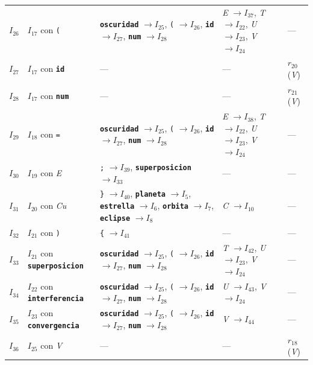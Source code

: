 \documentclass[12pt, letterpaper]{article}
\begin{document}
{\begin{longtable}{c l p{5.0cm} p{2.6cm} p{3.6cm}}
\addlinespace[2pt]
$I_{26}$ & $I_{17}$ con \texttt{(} & \textbf{\texttt{oscuridad}} $\to I_{25}$, \texttt{(} $\to I_{26}$, \textbf{\texttt{id}} $\to I_{27}$, \textbf{\texttt{num}} $\to I_{28}$ & \textit{E} $\to I_{37}$, \textit{T} $\to I_{22}$, \textit{U} $\to I_{23}$, \textit{V} $\to I_{24}$ & --- \\
\addlinespace[2pt]
$I_{27}$ & $I_{17}$ con \textbf{\texttt{id}} & --- & --- & $r_{20}$ (\textit{V}) \\
\addlinespace[2pt]
$I_{28}$ & $I_{17}$ con \textbf{\texttt{num}} & --- & --- & $r_{21}$ (\textit{V}) \\
\addlinespace[2pt]
$I_{29}$ & $I_{18}$ con \texttt{=} & \textbf{\texttt{oscuridad}} $\to I_{25}$, \texttt{(} $\to I_{26}$, \textbf{\texttt{id}} $\to I_{27}$, \textbf{\texttt{num}} $\to I_{28}$ & \textit{E} $\to I_{38}$, \textit{T} $\to I_{22}$, \textit{U} $\to I_{23}$, \textit{V} $\to I_{24}$ & --- \\
\addlinespace[2pt]
$I_{30}$ & $I_{19}$ con \textit{E} & \texttt{;} $\to I_{39}$, \textbf{\texttt{superposicion}} $\to I_{33}$ & --- & --- \\
\addlinespace[2pt]
$I_{31}$ & $I_{20}$ con \textit{Cu} & \texttt{\}} $\to I_{40}$, \textbf{\texttt{planeta}} $\to I_{5}$, \textbf{\texttt{estrella}} $\to I_{6}$, \textbf{\texttt{orbita}} $\to I_{7}$, \textbf{\texttt{eclipse}} $\to I_{8}$ & \textit{C} $\to I_{10}$ & --- \\
\addlinespace[2pt]
$I_{32}$ & $I_{21}$ con \texttt{)} & \texttt{\{} $\to I_{41}$ & --- & --- \\
\addlinespace[2pt]
$I_{33}$ & $I_{21}$ con \textbf{\texttt{superposicion}} & \textbf{\texttt{oscuridad}} $\to I_{25}$, \texttt{(} $\to I_{26}$, \textbf{\texttt{id}} $\to I_{27}$, \textbf{\texttt{num}} $\to I_{28}$ & \textit{T} $\to I_{42}$, \textit{U} $\to I_{23}$, \textit{V} $\to I_{24}$ & --- \\
\addlinespace[2pt]
$I_{34}$ & $I_{22}$ con \textbf{\texttt{interferencia}} & \textbf{\texttt{oscuridad}} $\to I_{25}$, \texttt{(} $\to I_{26}$, \textbf{\texttt{id}} $\to I_{27}$, \textbf{\texttt{num}} $\to I_{28}$ & \textit{U} $\to I_{43}$, \textit{V} $\to I_{24}$ & --- \\
\addlinespace[2pt]
$I_{35}$ & $I_{23}$ con \textbf{\texttt{convergencia}} & \textbf{\texttt{oscuridad}} $\to I_{25}$, \texttt{(} $\to I_{26}$, \textbf{\texttt{id}} $\to I_{27}$, \textbf{\texttt{num}} $\to I_{28}$ & \textit{V} $\to I_{44}$ & --- \\
\addlinespace[2pt]
$I_{36}$ & $I_{25}$ con \textit{V} & --- & --- & $r_{18}$ (\textit{V}) \\

\end{longtable}}
\end{document}
